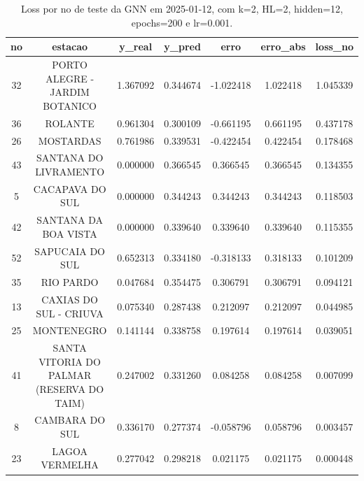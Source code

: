 \begin{table}[h]
\centering
\caption{Loss por no de teste da GNN em 2025-01-12, com k=2, HL=2, hidden=12, epochs=200 e lr=0.001.}
\label{tab:gnn_loss_k2_hl2_h12_e200_d20250112}
\begin{tabular}{ccccccc}
\toprule
no & estacao & y\_real & y\_pred & erro & erro\_abs & loss\_no \\
\midrule
32 & PORTO ALEGRE - JARDIM BOTANICO & 1.367092 & 0.344674 & -1.022418 & 1.022418 & 1.045339 \\
36 & ROLANTE & 0.961304 & 0.300109 & -0.661195 & 0.661195 & 0.437178 \\
26 & MOSTARDAS & 0.761986 & 0.339531 & -0.422454 & 0.422454 & 0.178468 \\
43 & SANTANA DO LIVRAMENTO & 0.000000 & 0.366545 & 0.366545 & 0.366545 & 0.134355 \\
5 & CACAPAVA DO SUL & 0.000000 & 0.344243 & 0.344243 & 0.344243 & 0.118503 \\
42 & SANTANA DA BOA VISTA & 0.000000 & 0.339640 & 0.339640 & 0.339640 & 0.115355 \\
52 & SAPUCAIA DO SUL & 0.652313 & 0.334180 & -0.318133 & 0.318133 & 0.101209 \\
35 & RIO PARDO & 0.047684 & 0.354475 & 0.306791 & 0.306791 & 0.094121 \\
13 & CAXIAS DO SUL - CRIUVA & 0.075340 & 0.287438 & 0.212097 & 0.212097 & 0.044985 \\
25 & MONTENEGRO & 0.141144 & 0.338758 & 0.197614 & 0.197614 & 0.039051 \\
41 & SANTA VITORIA DO PALMAR (RESERVA DO TAIM) & 0.247002 & 0.331260 & 0.084258 & 0.084258 & 0.007099 \\
8 & CAMBARA DO SUL & 0.336170 & 0.277374 & -0.058796 & 0.058796 & 0.003457 \\
23 & LAGOA VERMELHA & 0.277042 & 0.298218 & 0.021175 & 0.021175 & 0.000448 \\
\bottomrule
\end{tabular}
\end{table}
